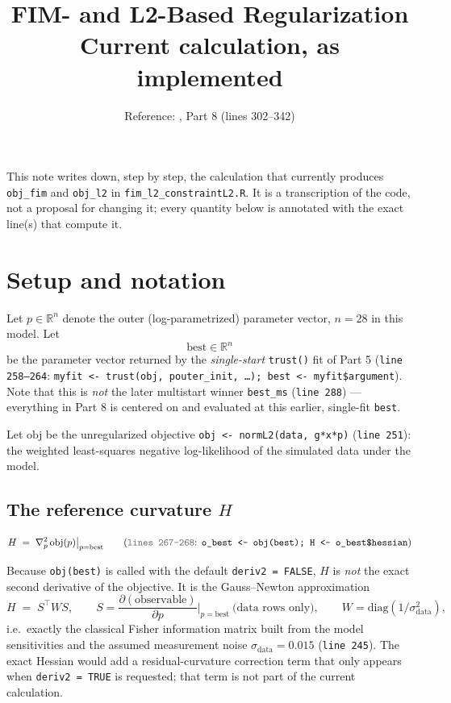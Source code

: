 \documentclass[11pt]{article}
\title{FIM- and L2-Based \code{constraintL2()} Regularization\\[2pt]
\large Current calculation, as implemented}
\author{}
\date{Reference: \file{scripts/fim\_l2\_constraintL2.R}, Part 8 (lines 302--342)}
\newcommand{\code}[1]{\texttt{#1}}
\newcommand{\file}[1]{\textcolor{black!60}{\texttt{#1}}}
\begin{document}
\maketitle
\vspace{-1.5em}

This note writes down, step by step, the calculation that currently produces
\code{obj\_fim} and \code{obj\_l2} in \file{fim\_l2\_constraintL2.R}. It is a
transcription of the code, not a proposal for changing it; every quantity
below is annotated with the exact line(s) that compute it.

\section{Setup and notation}

Let $p \in \mathbb{R}^n$ denote the outer (log-parametrized) parameter vector,
$n = 28$ in this model. Let
\[
  \mathrm{best} \in \mathbb{R}^n
\]
be the parameter vector returned by the \emph{single-start} \code{trust()}
fit of Part 5 (\file{line 258--264}: \code{myfit <- trust(obj, pouter\_init, \ldots); best <- myfit\$argument}).
Note that this is \emph{not} the later multistart winner \code{best\_ms}
(\file{line 288}) --- everything in Part 8 is centered on and evaluated at
this earlier, single-fit \code{best}.

Let $\mathrm{obj}$ be the unregularized objective \code{obj <- normL2(data, g*x*p)}
(\file{line 251}): the weighted least-squares negative log-likelihood of the
simulated data under the model.

\subsection*{The reference curvature $H$}

\begin{equation}
  H \;=\; \nabla^2_p\, \mathrm{obj}(p)\big|_{p = \mathrm{best}}
  \qquad\text{(\file{lines 267--268}: \code{o\_best <- obj(best); H <- o\_best\$hessian})}
\end{equation}

Because \code{obj(best)} is called with the default \code{deriv2 = FALSE},
$H$ is \emph{not} the exact second derivative of the objective. It is the
Gauss--Newton approximation
\begin{equation}
  H \;=\; S^\top W S,
  \qquad
  S = \frac{\partial(\text{observable})}{\partial p}\Big|_{p=\mathrm{best}}
  \ \text{(data rows only)},
  \qquad
  W = \mathrm{diag}\!\left(1/\sigma_{\text{data}}^2\right),
\end{equation}
i.e.\ exactly the classical Fisher information matrix built from the model
sensitivities and the assumed measurement noise $\sigma_{\text{data}} = 0.015$
(\file{line 245}). The exact Hessian would add a residual-curvature
correction term that only appears when \code{deriv2 = TRUE} is requested;
that term is not part of the current calculation.
\end{document}
